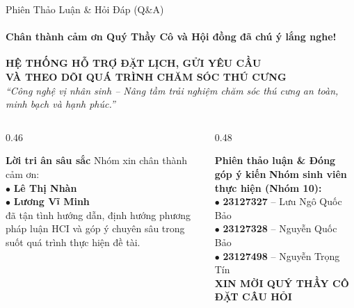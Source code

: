 \begin{frame}{Phiên Thảo Luận \& Hỏi Đáp (Q\&A)}
  \framesubtitle{\color{PetcareSecondary}\textbf{Chân thành cảm ơn Quý Thầy Cô và Hội đồng đã chú ý lắng nghe!}}

  \vspace{2mm}

  \begin{center}
    {\large \bfseries \color{PetcarePrimary} HỆ THỐNG HỖ TRỢ ĐẶT LỊCH, GỬI YÊU CẦU\\VÀ THEO DÕI QUÁ TRÌNH CHĂM SÓC THÚ CƯNG}\\[3mm]
    {\footnotesize \color{PetcareDark}\textit{``Công nghệ vị nhân sinh -- Nâng tầm trải nghiệm chăm sóc thú cưng an toàn, minh bạch và hạnh phúc.''}}
  \end{center}

  \vspace{3mm}

  \begin{columns}[c]
    \begin{column}{0.46\textwidth}
      \begin{block}{\footnotesize \textbf{Lời tri ân sâu sắc}}
        \scriptsize
        Nhóm xin chân thành cảm ơn:\\[1mm]
        $\bullet$ \textbf{Lê Thị Nhàn}\\
        $\bullet$ \textbf{Lương Vĩ Minh}\\[1mm]
        đã tận tình hướng dẫn, định hướng phương pháp luận HCI và góp ý chuyên sâu trong suốt quá trình thực hiện đề tài.
      \end{block}
    \end{column}

    \begin{column}{0.48\textwidth}
      \begin{exampleblock}{\footnotesize \textbf{Phiên thảo luận \& Đóng góp ý kiến}}
        \scriptsize
        \textbf{Nhóm sinh viên thực hiện (Nhóm 10):}\\[1mm]
        $\bullet$ \textbf{23127327} -- Lưu Ngô Quốc Bảo\\
        $\bullet$ \textbf{23127328} -- Nguyễn Quốc Bảo\\
        $\bullet$ \textbf{23127498} -- Nguyễn Trọng Tín\\[2mm]
        \centering
        {\normalsize \bfseries \color{PetcareSecondary} XIN MỜI QUÝ THẦY CÔ ĐẶT CÂU HỎI}
      \end{exampleblock}
    \end{column}
  \end{columns}
\end{frame}
